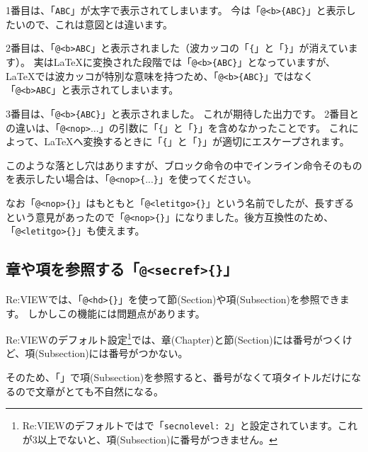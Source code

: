 \starterresult
\begin{starterprogram}\end{starterprogram}
\endstarterresult

1番目は、「\texttt{ABC}」が太字で表示されてしまいます。
今は「\texttt{@\textless{}b\textgreater{}\{ABC\}}」と表示したいので、これは意図とは違います。

2番目は、「\texttt{@\textless{}b\textgreater{}ABC}」と表示されました（波カッコの「\texttt{\{}」と「\texttt{\}}」が消えています）。
実は\LaTeX{}に変換された段階では「\texttt{@\textless{}b\textgreater{}\{ABC\}}」となっていますが、\LaTeX{}では波カッコが特別な意味を持つため、「\texttt{@\textless{}b\textgreater{}\{ABC\}}」ではなく「\texttt{@\textless{}b\textgreater{}ABC}」と表示されてしまいます。

3番目は、「\texttt{@\textless{}b\textgreater{}\{ABC\}}」と表示されました。
これが期待した出力です。
2番目との違いは、「\texttt{@}\texttt{\textless{}nop\textgreater{}\textdollar{}}...\texttt{\textdollar{}}」の引数に「\texttt{\{}」と「\texttt{\}}」を含めなかったことです。
これによって、\LaTeX{}へ変換するときに「\texttt{\{}」と「\texttt{\}}」が適切にエスケープされます。

このような落とし穴はありますが、ブロック命令の中でインライン命令そのものを表示したい場合は、「\texttt{@\textless{}nop\textgreater{}\{}...\texttt{\}}」を使ってください。

なお「\texttt{@\textless{}nop\textgreater{}\{\}}」はもともと「\texttt{@\textless{}letitgo\textgreater{}\{\}}」という名前でしたが、長すぎるという意見があったので「\texttt{@\textless{}nop\textgreater{}\{\}}」になりました。後方互換性のため、「\texttt{@\textless{}letitgo\textgreater{}\{\}}」も使えます。

\subsection*{章や項を参照する「\texttt{@}\texttt{\textless{}secref\textgreater{}\{\}}」}
\label{sec:1-1-18}

Re:VIEWでは、「\texttt{@}\texttt{\textless{}hd\textgreater{}\{\}}」を使って節(Section)や項(Subsection)を参照できます。
しかしこの機能には問題点があります。

\begin{starteritemize}
\item Re:VIEWのデフォルト設定\footnote{Re:VIEWのデフォルトではで「\texttt{secnolevel: 2}」と設定されています。これが3以上でないと、項(Subsection)に番号がつきません。}では、章(Chapter)と節(Section)には番号がつくけど、項(Subsection)には番号がつかない。
\item そのため、「」で項(Subsection)を参照すると、番号がなくて項タイトルだけになるので文章がとても不自然になる。
\end{starteritemize}

